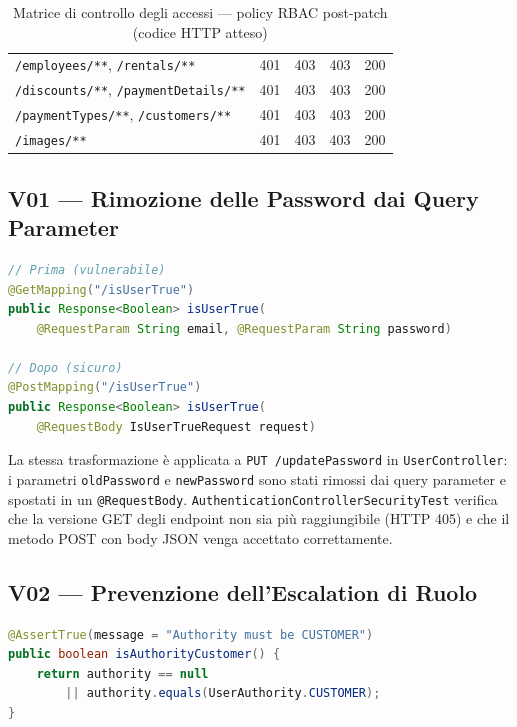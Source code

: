 \documentclass[12pt, a4paper]{article}
\begin{document}
\begin{table}[H]
\begin{tabular}{|p{5.2cm}|c|c|c|c|}
            \texttt{/employees/**}, \texttt{/rentals/**}                                  & 401 & 403 & 403 & 200 \\
            \texttt{/discounts/**}, \texttt{/paymentDetails/**}                           & 401 & 403 & 403 & 200 \\
            \texttt{/paymentTypes/**}, \texttt{/customers/**}                             & 401 & 403 & 403 & 200 \\
            \texttt{/images/**}                                                            & 401 & 403 & 403 & 200 \\
            \hline
        \end{tabular}
        \caption{Matrice di controllo degli accessi — policy RBAC post-patch (codice HTTP atteso)}
        \label{tab:rbac-matrix}
    \end{table}

    \subsection{V01 --- Rimozione delle Password dai Query Parameter}

    \begin{lstlisting}[language=Java, caption={AuthenticationController.java --- password in request body}]
// Prima (vulnerabile)
@GetMapping("/isUserTrue")
public Response<Boolean> isUserTrue(
    @RequestParam String email, @RequestParam String password)

// Dopo (sicuro)
@PostMapping("/isUserTrue")
public Response<Boolean> isUserTrue(
    @RequestBody IsUserTrueRequest request)
    \end{lstlisting}

    La stessa trasformazione è applicata a \texttt{PUT /updatePassword} in
    \texttt{UserController}: i parametri \texttt{oldPassword} e \texttt{newPassword}
    sono stati rimossi dai query parameter e spostati in un \texttt{@RequestBody}.
    \texttt{AuthenticationControllerSecurityTest} verifica che la versione GET degli
    endpoint non sia più raggiungibile (HTTP 405) e che il metodo POST con body JSON
    venga accettato correttamente.

    \subsection{V02 --- Prevenzione dell'Escalation di Ruolo}

    \begin{lstlisting}[language=Java, caption={SignUpReqeust.java --- validatore @AssertTrue}]
@AssertTrue(message = "Authority must be CUSTOMER")
public boolean isAuthorityCustomer() {
    return authority == null
        || authority.equals(UserAuthority.CUSTOMER);
}
    \end{lstlisting}
\end{document}
